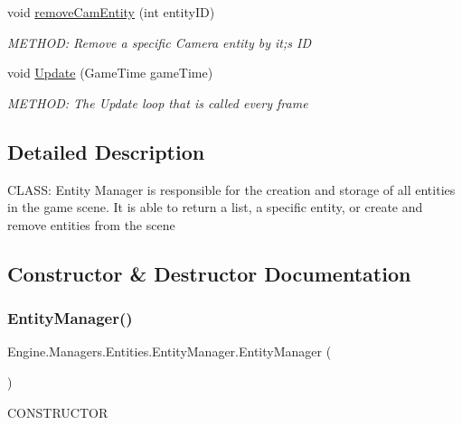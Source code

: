 \begin{DoxyCompactItemize}
void \hyperlink{a00518_a5f4c775a02bbb9057577780643a7b068}{remove\+Cam\+Entity} (int entity\+ID)
\begin{DoxyCompactList}\small\item\em M\+E\+T\+H\+OD\+: Remove a specific Camera entity by it;s ID \end{DoxyCompactList}\item 
void \hyperlink{a00518_a386e96f9edb12689118de624c559de0f}{Update} (Game\+Time game\+Time)
\begin{DoxyCompactList}\small\item\em M\+E\+T\+H\+OD\+: The Update loop that is called every frame \end{DoxyCompactList}\end{DoxyCompactItemize}


\subsection{Detailed Description}
C\+L\+A\+SS\+: Entity Manager is responsible for the creation and storage of all entities in the game scene. It is able to return a list, a specific entity, or create and remove entities from the scene 



\subsection{Constructor \& Destructor Documentation}
\mbox{\label{a00518_a0fd18e00f80a32046831041574e8a6a8}} 
\subsubsection{\texorpdfstring{Entity\+Manager()}{EntityManager()}}
{\footnotesize\ttfamily Engine.\+Managers.\+Entities.\+Entity\+Manager.\+Entity\+Manager (\begin{DoxyParamCaption}{ }\end{DoxyParamCaption})\hspace{0.3cm}{\ttfamily [inline]}}



C\+O\+N\+S\+T\+R\+U\+C\+T\+OR 



